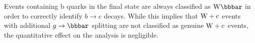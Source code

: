 {Events containing b quarks in the final state are always classified as $\Wbb$ in order
to correctly identify $b\to c$ decays. While this
implies that $\mathrm{W+c}$ events with additional $g\to\bbbar$ splitting are not
classified as genuine $\mathrm{W+c}$ events, the quantitative effect on the analysis is
negligible. 
%


}
